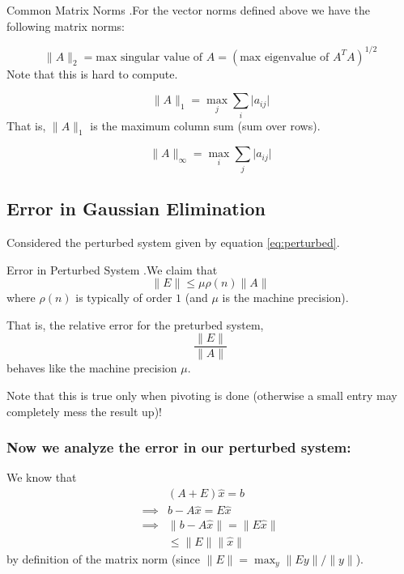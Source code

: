 \documentclass[12pt,letterpaper]{article}
\begin{document}
\begin{theo}{Common Matrix Norms}
.For the vector norms defined above we have the following matrix norms:

\begin{equation}
	\lVert A \rVert_2 = \text{max singular value of } A = \left( \text{max eigenvalue of } A^TA \right)^{1/2}
\end{equation}
Note that this is hard to compute.

\medskip

\begin{equation}
	\lVert A \rVert_1 = \max_j \sum_i \lvert a_{ij} \rvert
\end{equation}
That is, $\lVert A \rVert_1$ is the maximum column sum (sum over rows).

\medskip

\begin{equation}
	\lVert A \rVert_\infty = \max_i \sum_j \lvert a_{ij} \rvert
\end{equation}
\label{thm:matrix_norms}
\end{theo}

\subsection{Error in Gaussian Elimination}
Considered the perturbed system given by equation \ref{eq:perturbed}.

\begin{theo}{Error in Perturbed System}
.We claim that
\begin{equation}
	\lVert E \rVert \leq \mu \rho(n) \lVert A \rVert
\end{equation}
where $\rho(n)$ is typically of order $1$ (and $\mu$ is the machine precision).

\medskip

That is, the relative error for the preturbed system,
\begin{equation}
	\frac{\lVert E \rVert}{\lVert A \rVert}
\end{equation}
behaves like the machine precision $\mu$.
\label{thm:perturbed_error}
\end{theo}

Note that this is true only when pivoting is done (otherwise a small entry may completely mess the result up)!

\subsubsection*{Now we analyze the error in our perturbed system:}
We know that
\begin{align}
	& (A+E)\hat{x} = b \\
	\implies & b - A \hat{x} = E \hat{x} \\
	\implies & \lVert b - A\hat{x} \rVert = \lVert E \hat{x} \rVert \\
	& \leq \lVert E \rVert \lVert \hat{x} \rVert
\end{align}
by definition of the matrix norm (since $\lVert E \rVert = \max_y \lVert Ey \rVert / \lVert y \rVert$).
\end{document}
